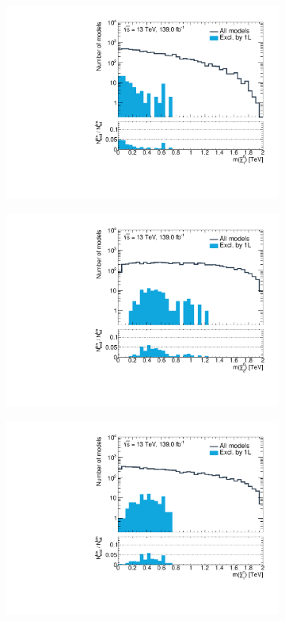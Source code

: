  \begin{figure}
	\centering
	\begin{subfigure}[b]{0.5\linewidth}
		\centering\includegraphics[width=\textwidth]{1D/m_chi_10}
	\end{subfigure}\hfill
	\begin{subfigure}[b]{0.5\linewidth}
		\centering\includegraphics[width=\textwidth]{1D/m_chi_20}
	\end{subfigure}\hfill
	\begin{subfigure}[b]{0.5\linewidth}
		\centering\includegraphics[width=\textwidth]{1D/m_chi_1p}

\end{subfigure}
\end{figure}
